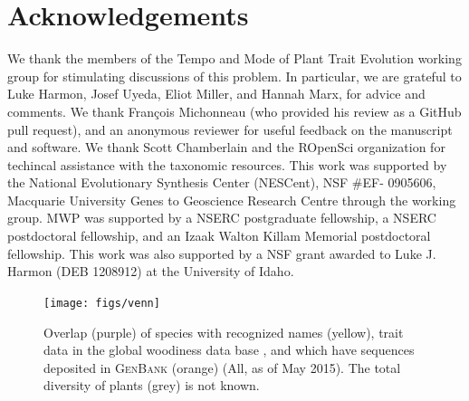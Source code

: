 \documentclass[a4paper,11pt]{article}
\begin{document}
\section{Acknowledgements}
We thank the members of the Tempo and Mode of Plant Trait
Evolution working group for stimulating discussions of this problem. In particular, we are grateful to Luke Harmon, Josef Uyeda, Eliot Miller, and Hannah Marx, for advice and comments. We thank Fran\c{c}ois Michonneau (who provided his review as a GitHub pull request), and an anonymous reviewer for useful feedback on the manuscript and software. We thank Scott Chamberlain and the ROpenSci organization for techincal assistance with the taxonomic resources. This work was supported by the National Evolutionary Synthesis Center
(NESCent), NSF \#EF- 0905606, Macquarie University Genes to Geoscience
Research Centre through the working group. MWP was supported by a NSERC postgraduate fellowship, a NSERC postdoctoral fellowship, and an Izaak Walton Killam Memorial postdoctoral fellowship. This work was also supported by a NSF grant awarded to Luke J. Harmon (DEB 1208912) at the University of Idaho.


\clearpage




\begin{figure}[p]
\texttt{[image: figs/venn]}
\caption{Overlap (purple) of species with recognized names (yellow), trait data in the global woodiness data base \citep[blue][]{Zanne, FitzJohn2014}, and which have sequences deposited in \textsc{GenBank} (orange) (All, as of May 2015). The total diversity of plants (grey) is not known.}
\label{fig:venn}
\end{figure}
\end{document}
